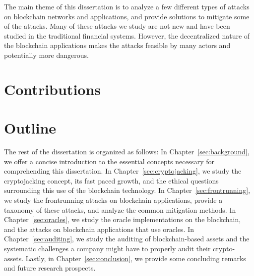 The main theme of this dissertation is to analyze a few different types of attacks on blockchain networks and applications, and provide solutions to mitigate some of the attacks. Many of these attacks we study are not new and have been studied in the traditional financial systems. However, the decentralized nature of the blockchain applications makes the attacks feasible by many actors and potentially more dangerous. 



\section{Contributions}



\section{Outline}
The rest of the dissertation is organized as follows: In Chapter~\ref{sec:background}, we offer a concise introduction to the essential concepts necessary for comprehending this dissertation. In Chapter~\ref{sec:cryptojacking}, we study the cryptojacking concept, its fast paced growth, and the ethical questions surrounding this use of the blockchain technology. In Chapter~\ref{sec:frontrunning}, we study the frontrunning attacks on blockchain applications, provide a taxonomy of these attacks, and analyze the common mitigation methods. In Chapter~\ref{sec:oracles}, we study the oracle implementations on the blockchain, and the attacks on blockchain applications that use oracles. In Chapter~\ref{sec:auditing}, we study the auditing of blockchain-based assets and the systematic challenges a company might have to properly audit their crypto-assets. Lastly, in Chapter~\ref{sec:conclusion}, we provide some concluding remarks and future research prospects.